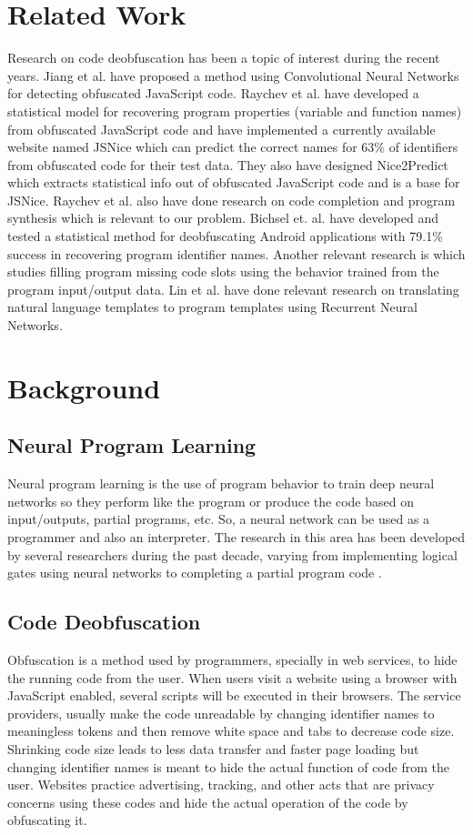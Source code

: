 \documentclass[acmsmall]{acmart}
\begin{document}
\section{Related Work}
Research on code deobfuscation has been a topic of interest during the recent years. Jiang et al. \cite{jiangcnn} have proposed a method using Convolutional Neural Networks for detecting obfuscated JavaScript code. Raychev et al. \cite{jsnice1} have developed a statistical model for recovering program properties (variable and function names) from obfuscated JavaScript code  and have implemented a currently available website named JSNice \cite{jsnice3} which can predict the correct names for 63\% of identifiers from obfuscated code for their test data. They also have designed Nice2Predict \cite{nice2predict} which extracts statistical info out of obfuscated JavaScript code and is a base for JSNice. Raychev et al. \cite{Raychev2014} also have done research on code completion and program synthesis  which is relevant to our problem. Bichsel et. al. \cite{bichselandroid} have developed and tested a statistical method for deobfuscating Android applications with 79.1\% success in recovering program identifier names. Another relevant research is \cite{forth} which studies filling program missing code slots using the behavior trained from the program input/output data. Lin et al. \cite{nlprnn} have done relevant research on translating natural language templates to program templates using Recurrent Neural Networks.

\section{Background}
\subsection{Neural Program Learning}
Neural program learning is the use of program behavior to train deep neural networks so they perform like the program or produce the code based on input/outputs, partial programs, etc. So, a neural network can be used as a programmer and also an interpreter. The research in this area has been developed by several researchers during the past decade, varying from implementing logical gates using neural networks \cite{neto} to completing a partial program code \cite{forth}.
\subsection{Code Deobfuscation}
Obfuscation is a method used by programmers, specially in web services, to hide the running code from the user. When users visit a website using a browser with JavaScript enabled, several scripts will be executed in their browsers. The service providers, usually make the code unreadable by changing identifier names to meaningless tokens and then remove white space and tabs to decrease code size. Shrinking code size leads to less data transfer and faster page loading but changing identifier names is meant to hide the actual function of code from the user. Websites practice advertising, tracking, and other acts that are privacy concerns using these codes and hide the actual operation of the code by obfuscating it.
\end{document}
